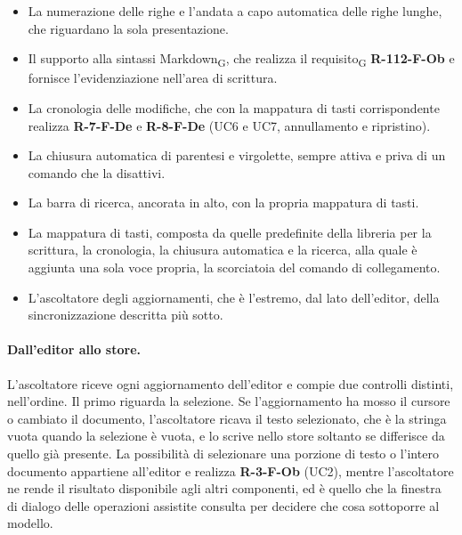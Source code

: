 \documentclass[a4paper, 10pt]{article}
\begin{document}
\begin{itemize}
    \setlength{\itemsep}{3pt}
    \item La numerazione delle righe e l'andata a capo automatica delle righe lunghe, che riguardano la sola presentazione.

    \item Il supporto alla sintassi Markdown\textsubscript{G}, che realizza il requisito\textsubscript{G} \textbf{R-112-F-Ob} e fornisce l'evidenziazione nell'area di scrittura.

    \item La cronologia delle modifiche, che con la mappatura di tasti corrispondente realizza \textbf{R-7-F-De} e \textbf{R-8-F-De} (UC6 e UC7, annullamento e ripristino).

    \item La chiusura automatica di parentesi e virgolette, sempre attiva e priva di un comando che la disattivi.

    \item La barra di ricerca, ancorata in alto, con la propria mappatura di tasti.

    \item La mappatura di tasti, composta da quelle predefinite della libreria per la scrittura, la cronologia, la chiusura automatica e la ricerca, alla quale è aggiunta una sola voce propria, la scorciatoia del comando di collegamento.

    \item L'ascoltatore degli aggiornamenti, che è l'estremo, dal lato dell'editor, della sincronizzazione descritta più sotto.
\end{itemize}

\paragraph{Dall'editor allo store.}
L'ascoltatore riceve ogni aggiornamento dell'editor e compie due controlli distinti, nell'ordine. Il primo riguarda la selezione. Se l'aggiornamento ha mosso il cursore o cambiato il documento, l'ascoltatore ricava il testo selezionato, che è la stringa vuota quando la selezione è vuota, e lo scrive nello store soltanto se differisce da quello già presente. La possibilità di selezionare una porzione di testo o l'intero documento appartiene all'editor e realizza \textbf{R-3-F-Ob} (UC2), mentre l'ascoltatore ne rende il risultato disponibile agli altri componenti, ed è quello che la finestra di dialogo delle operazioni assistite consulta per decidere che cosa sottoporre al modello.
\end{document}
